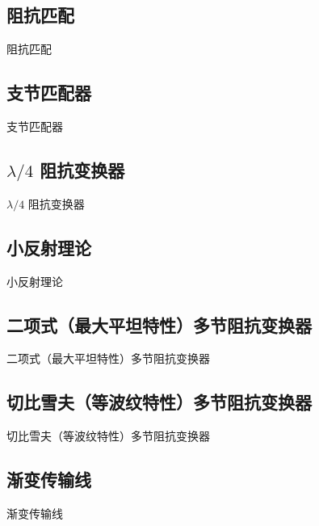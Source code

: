 \subsection{阻抗匹配}
\begin{frame}{阻抗匹配}

\end{frame}

\subsection{支节匹配器}
\begin{frame}{支节匹配器}

\end{frame}

\subsection{$\lambda/4$ 阻抗变换器}
\begin{frame}{$\lambda/4$ 阻抗变换器}

\end{frame}

\subsection{小反射理论}
\begin{frame}{小反射理论}

\end{frame}

\subsection{二项式（最大平坦特性）多节阻抗变换器}
\begin{frame}{二项式（最大平坦特性）多节阻抗变换器}

\end{frame}

\subsection{切比雪夫（等波纹特性）多节阻抗变换器}
\begin{frame}{切比雪夫（等波纹特性）多节阻抗变换器}

\end{frame}

\subsection{渐变传输线}
\begin{frame}{渐变传输线}

\end{frame}
